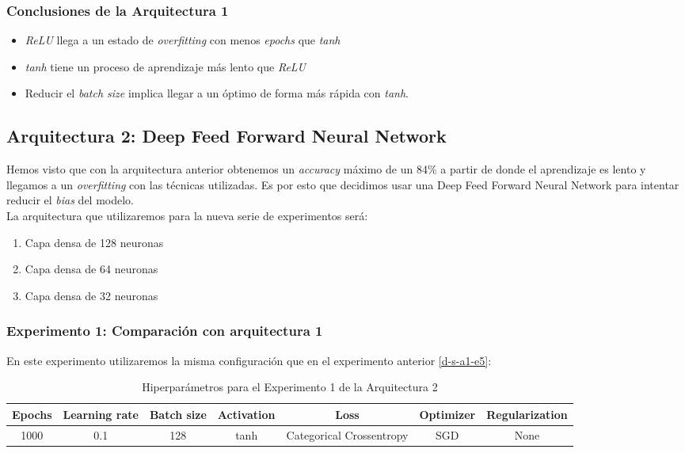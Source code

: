 \documentclass{article}
\begin{document}
		\subsubsection{Conclusiones de la Arquitectura 1}
		\label{d-cl-a1}
			\begin{itemize}
				\item \textit{ReLU} llega a un estado de \textit{overfitting} con menos \textit{epochs} que \textit{tanh}
				\item \textit{tanh} tiene un proceso de aprendizaje m\'as lento que \textit{ReLU}
				\item Reducir el \textit{batch size} implica llegar a un \'optimo de forma m\'as r\'apida con \textit{tanh}.
			\end{itemize}
			
	\subsection{Arquitectura 2: Deep Feed Forward Neural Network}
	\label{d-s-a2}
		Hemos visto que con la arquitectura anterior obtenemos un \textit{accuracy} m\'aximo de un 84\% a partir de donde el aprendizaje es lento y llegamos a un \textit{overfitting} con las t\'ecnicas utilizadas. Es por esto que decidimos usar una Deep Feed Forward Neural Network para intentar reducir el \textit{bias} del modelo.\\
		La arquitectura que utilizaremos para la nueva serie de experimentos ser\'a:
		
		\begin{enumerate}
			\item Capa densa de 128 neuronas
			\item Capa densa de 64 neuronas
			\item Capa densa de 32 neuronas
		\end{enumerate}
		
		\subsubsection{Experimento 1: Comparaci\'on con arquitectura 1}
		\label{d-s-a2-e1}
			En este experimento utilizaremos la misma configuraci\'on que en el experimento anterior \ref{d-s-a1-e5}:
			\begin{table}[!h]
				\begin{center}
					\begin{tabular}{| c | c | c | c | c | c | c |}
						\textbf{Epochs} & \textbf{Learning rate} & \textbf{Batch size} & \textbf{Activation} & \textbf{Loss} & \textbf{Optimizer} & \textbf{Regularization} \\ \hline
						1000 & 0.1 & 128 & tanh & Categorical Crossentropy & SGD & None
					\end{tabular}
					\caption{Hiperpar\'ametros para el Experimento 1 de la Arquitectura 2}
					\label{tab:hip-d-a2-e1}
				\end{center}
			\end{table}
			
\end{document}
